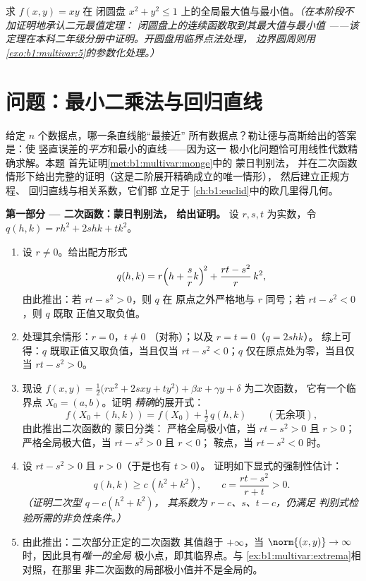 \begin{exercise}[$\star\star\star$]\label{exo:b1:multivar:12}
求 $f(x, y) = xy$ 在
闭圆盘 $x^2 + y^2 \leq 1$ 上的全局最大值与最小值。\emph{（在本阶段不加证明地承认二元最值定理：
闭圆盘上的连续函数取到其最大值与最小值
——该定理在本科二年级分册中证明。开圆盘用临界点法处理，
边界圆周则用
\cref{exo:b1:multivar:5}的参数化处理。）}
\end{exercise}

\section{问题：最小二乘法与回归直线}

\begin{problem}\label{pb:b1:multivar:1}
给定 $n$ 个数据点，哪一条直线能“最接近”
所有数据点？勒让德与高斯给出的答案是：使
竖直误差的\emph{平方}和最小的直线——因为这一
极小化问题恰可用线性代数精确求解。本题
首先证明\cref{met:b1:multivar:monge}中的 蒙日判别法，
并在二次函数情形下给出完整的证明（这是二阶展开精确成立的唯一情形），
然后建立正规方程、
回归直线与相关系数，它们都
立足于
\cref{ch:b1:euclid}中的欧几里得几何。

\medskip
\noindent\textbf{第一部分 --- 二次函数：蒙日判别法，
给出证明。} 设 $r, s, t$ 为实数，令 $q(h, k) = r h^2 + 2s hk +
t k^2$。
\begin{enumerate}
  \item 设 $r \neq 0$。给出配方形式
        \[
        q(h, k) = r\Bigl(h + \frac{s}{r}k\Bigr)^{\!2}
        + \frac{rt - s^2}{r}\,k^2 ,
        \]
        由此推出：若 $rt - s^2 > 0$，则 $q$ 在
        原点之外严格地与 $r$ 同号；若 $rt - s^2 < 0$，则 $q$ 既取
        正值又取负值。
  \item 处理其余情形：$r = 0$，$t \neq 0$
        （对称）；以及 $r = t = 0$（$q = 2shk$）。
        综上可得：$q$ 既取正值又取负值，当且仅当 $rt - s^2 < 0$；$q$
        仅在原点处为零，当且仅当 $rt - s^2 > 0$。
  \item 现设 $f(x, y) = \frac12\bigl(r x^2 + 2s xy + t
        y^2\bigr) + \beta x + \gamma y + \delta$ 为二次函数，
        它有一个临界点 $X_0 = (a, b)$。证明
        \emph{精确}的展开式：
        \[
        f(X_0 + (h,k)) = f(X_0) + \tfrac12\,q(h, k)
        \qquad (\text{无余项}),
        \]
        由此推出二次函数的 蒙日分类：
        严格全局极小值，当 $rt - s^2 > 0$ 且 $r >
        0$；严格全局极大值，当 $rt - s^2 > 0$ 且 $r < 0$；
        鞍点，当 $rt - s^2 < 0$ 时。
  \item 设 $rt - s^2 > 0$ 且 $r > 0$（于是也有 $t > 0$）。
        证明如下显式的强制性估计：
        \[
        q(h, k) \geq c\,(h^2 + k^2),
        \qquad
        c = \frac{rt - s^2}{r + t} > 0 .
        \]
        \emph{（证明二次型 $q - c(h^2 + k^2)$，
        其系数为 $r - c$、$s$、$t - c$，仍满足
        判别式检验所需的非负性条件。）}
  \item 由此推出：二次部分正定的二次函数
        其值趋于 $+\infty$，当 $\norm{(x,y)} \to
        \infty$ 时，因此具有\emph{唯一的全局}
        极小点，即其临界点。与
        \cref{ex:b1:multivar:extrema}相对照，在那里
        非二次函数的局部极小值并不是全局的。
\end{enumerate}


\end{problem}
